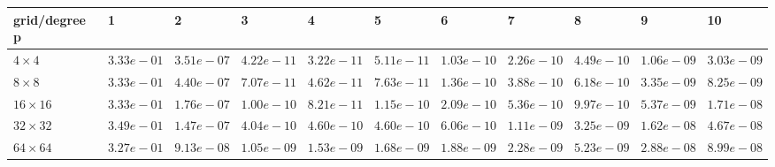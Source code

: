 \begin{tabular}{lllllllllll}
\hline
 grid/degree p   & 1          & 2          & 3          & 4          & 5          & 6          & 7          & 8          & 9          & 10         \\
\hline
 $4 \times 4$    & $3.33e-01$ & $3.51e-07$ & $4.22e-11$ & $3.22e-11$ & $5.11e-11$ & $1.03e-10$ & $2.26e-10$ & $4.49e-10$ & $1.06e-09$ & $3.03e-09$ \\
 $8 \times 8$    & $3.33e-01$ & $4.40e-07$ & $7.07e-11$ & $4.62e-11$ & $7.63e-11$ & $1.36e-10$ & $3.88e-10$ & $6.18e-10$ & $3.35e-09$ & $8.25e-09$ \\
 $16 \times 16$  & $3.33e-01$ & $1.76e-07$ & $1.00e-10$ & $8.21e-11$ & $1.15e-10$ & $2.09e-10$ & $5.36e-10$ & $9.97e-10$ & $5.37e-09$ & $1.71e-08$ \\
 $32 \times 32$  & $3.49e-01$ & $1.47e-07$ & $4.04e-10$ & $4.60e-10$ & $4.60e-10$ & $6.06e-10$ & $1.11e-09$ & $3.25e-09$ & $1.62e-08$ & $4.67e-08$ \\
 $64 \times 64$  & $3.27e-01$ & $9.13e-08$ & $1.05e-09$ & $1.53e-09$ & $1.68e-09$ & $1.88e-09$ & $2.28e-09$ & $5.23e-09$ & $2.88e-08$ & $8.99e-08$ \\
\hline
\end{tabular}